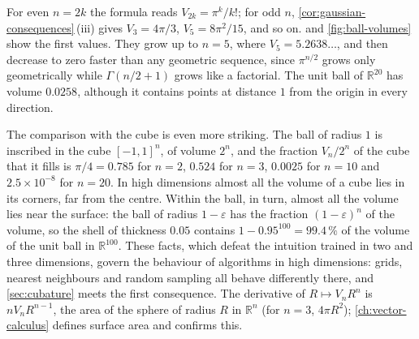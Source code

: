 For even $n=2k$ the formula reads $V_{2k}=\pi^k/k!$; for odd $n$, \cref{cor:gaussian-consequences}\,(iii) gives $V_3=4\pi/3$, $V_5=8\pi^2/15$, and so on.  and \cref{fig:ball-volumes} show the first values. They grow up to $n=5$, where $V_5=5.2638\ldots$, and then decrease to zero faster than any geometric sequence, since $\pi^{n/2}$ grows only geometrically while $\Gamma(n/2+1)$ grows like a factorial. The unit ball of $\mathbb R^{20}$ has volume $0.0258$, although it contains points at distance $1$ from the origin in every direction.

The comparison with the cube is even more striking. The ball of radius $1$ is inscribed in the cube $[-1,1]^n$, of volume $2^n$, and the fraction $V_n/2^n$ of the cube that it fills is $\pi/4=0.785$ for $n=2$, $0.524$ for $n=3$, $0.0025$ for $n=10$ and $2.5\times10^{-8}$ for $n=20$. In high dimensions almost all the volume of a cube lies in its corners, far from the centre. Within the ball, in turn, almost all the volume lies near the surface: the ball of radius $1-\varepsilon$ has the fraction $(1-\varepsilon)^n$ of the volume, so the shell of thickness $0.05$ contains $1-0.95^{100}=99.4\,\%$ of the volume of the unit ball in $\mathbb R^{100}$. These facts, which defeat the intuition trained in two and three dimensions, govern the behaviour of algorithms in high dimensions: grids, nearest neighbours and random sampling all behave differently there, and \cref{sec:cubature} meets the first consequence. The derivative of $R\mapsto V_nR^n$ is $nV_nR^{n-1}$, the area of the sphere of radius $R$ in $\mathbb R^n$ (for $n=3$, $4\pi R^2$); \cref{ch:vector-calculus} defines surface area and confirms this.

\begin{table}
\end{table}

